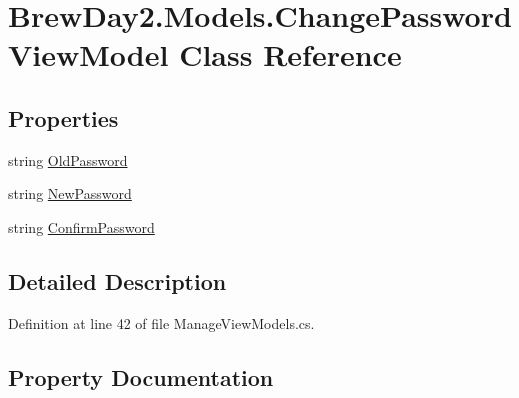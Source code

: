 \hypertarget{class_brew_day2_1_1_models_1_1_change_password_view_model}{}\section{Brew\+Day2.\+Models.\+Change\+Password\+View\+Model Class Reference}
\label{class_brew_day2_1_1_models_1_1_change_password_view_model}
\subsection*{Properties}
\begin{DoxyCompactItemize}
\item 
string \mbox{\hyperlink{class_brew_day2_1_1_models_1_1_change_password_view_model_a576d062ce3921fbe8e282f88fd05bebb}{Old\+Password}}
\item 
string \mbox{\hyperlink{class_brew_day2_1_1_models_1_1_change_password_view_model_aae850d1331308b7aada72d07c4b6eb46}{New\+Password}}
\item 
string \mbox{\hyperlink{class_brew_day2_1_1_models_1_1_change_password_view_model_a61ee313ac3a5f99336c72e8500f787f7}{Confirm\+Password}}
\end{DoxyCompactItemize}


\subsection{Detailed Description}


Definition at line 42 of file Manage\+View\+Models.\+cs.



\subsection{Property Documentation}
\mbox{\label{class_brew_day2_1_1_models_1_1_change_password_view_model_a61ee313ac3a5f99336c72e8500f787f7}} 

